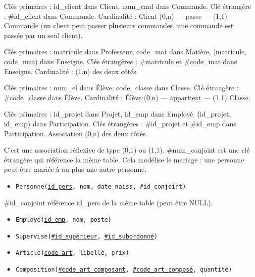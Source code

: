 Clés primaires : id\_client dans Client, num\_cmd dans Commande. Clé étrangère : \#id\_client dans Commande. Cardinalité : Client (0,n) --- passe --- (1,1) Commande (un client peut passer plusieurs commandes, une commande est passée par un seul client).

Clés primaires : matricule dans Professeur, code\_mat dans Matière, (matricule, code\_mat) dans Enseigne. Clés étrangères : \#matricule et \#code\_mat dans Enseigne. Cardinalité : (1,n) des deux côtés.

Clés primaires : num\_el dans Élève, code\_classe dans Classe. Clé étrangère : \#code\_classe dans Élève. Cardinalité : Élève (0,n) --- appartient --- (1,1) Classe.

Clés primaires : id\_projet dans Projet, id\_emp dans Employé, (id\_projet, id\_emp) dans Participation. Clés étrangères : \#id\_projet et \#id\_emp dans Participation. Association (0,n) des deux côtés.

C'est une association réflexive de type (0,1) ou (1,1). \#num\_conjoint est une clé étrangère qui référence la même table. Cela modélise le mariage : une personne peut être mariée à au plus une autre personne.

\begin{itemize}
    \item \texttt{Personne(\underline{id\_pers}, nom, date\_naiss, \#id\_conjoint)}
\end{itemize}
\#id\_conjoint référence id\_pers de la même table (peut être NULL).

\begin{itemize}
    \item \texttt{Employé(\underline{id\_emp}, nom, poste)}
    \item \texttt{Supervise(\underline{\#id\_supérieur}, \underline{\#id\_subordonné})}
\end{itemize}

\begin{itemize}
    \item \texttt{Article(\underline{code\_art}, libellé, prix)}
    \item \texttt{Composition(\underline{\#code\_art\_composant}, \underline{\#code\_art\_composé}, quantité)}
\end{itemize}

